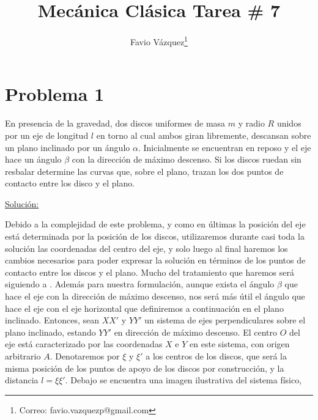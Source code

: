 \documentclass[a4paper,10pt]{article}
\title{Mecánica Clásica Tarea \# 7}
\author{Favio Vázquez\thanks{Correo: favio.vazquezp@gmail.com}}\affil{Instituto de Ciencias Nucleares. Universidad Nacional Autónoma de México.}
\date{}
\numberwithin{equation}{section}
\begin{document}
\makeatletter
\def\@maketitle{%
  \newpage
  \null
  \vskip 2em%
  \begin{center}%
  \let \footnote \thanks
    {\Large\bfseries \@title \par}%
    \vskip 1.5em%
    {\normalsize
      \lineskip .5em%
      \begin{tabular}[t]{c}%
        \@author
      \end{tabular}\par}%
    \vskip 1em%
    {\normalsize \@date}%
  \end{center}%
  \par
  \vskip 1.5em}
\makeatother

\maketitle

\section{Problema 1}

En presencia de la gravedad, dos discos uniformes de masa $m$ y radio $R$ unidos por 
un eje de longitud $l$ en torno al cual ambos giran libremente, descansan sobre un plano 
inclinado por un ángulo $\alpha$. Inicialmente se encuentran en reposo y el eje hace un ángulo 
$\beta$ con la dirección de máximo descenso. Si los discos ruedan sin resbalar determine 
las curvas que, sobre el plano, trazan los dos puntos de contacto entre los disco y el plano.

\vspace{.3cm}

\underline{Solución:} \vspace{.3cm}

Debido a la complejidad de este problema, y como en últimas la posición del eje 
está determinada por la posición de los discos, utilizaremos durante casi toda la solución 
las coordenadas del centro del eje, y solo luego al final haremos los cambios necesarios 
para poder expresar la solución en términos de los puntos de contacto entre los 
discos y el plano. Mucho del tratamiento que haremos será siguiendo a \cite{ginoux}. Además para nuestra formulación, aunque 
exista el ángulo $\beta$ que hace el eje con la dirección de máximo descenso, nos será 
más útil el ángulo que hace el eje con el eje horizontal que definiremos a continuación 
en el plano inclinado. Entonces, sean $XX'$ y $YY'$ un sistema de ejes perpendiculares 
sobre el plano inclinado, estando $YY'$ en dirección de máximo descenso. El centro 
$O$ del eje está caracterizado por las coordenadas $X$ e $Y$ en este sistema, con 
origen arbitrario $A$. Denotaremos por $\xi$ y $\xi'$ a los centros de los discos, que será 
la misma posición de los puntos de apoyo de los discos por construcción, y la 
distancia $l=\xi\xi'$. Debajo se encuentra una imagen ilustrativa del sistema físico,
\end{document}
